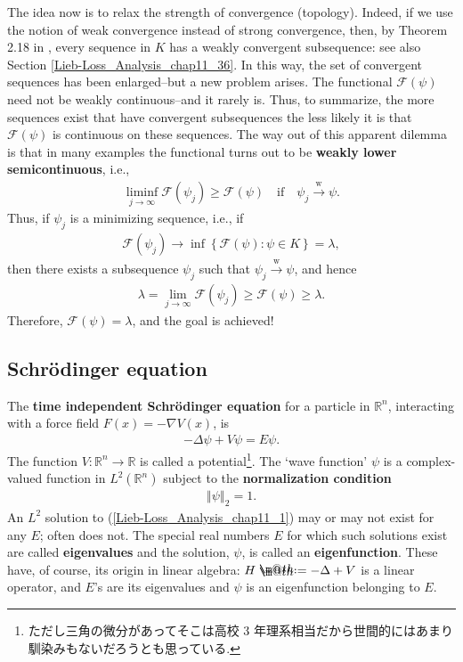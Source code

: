 \documentclass[openany, a4paper, oneside]{book}
\makeatletter
\newcommand*{\defeq}{\mathrel{\rlap{%
\raisebox{0.3ex}{$\m@th\cdot$}}%
\raisebox{-0.3ex}{$\m@th\cdot$}}%
=}
\theoremstyle{break}
\theoremstyle{breakdefn}
\newcommand{\norm}[1]{\left\Vert#1\right\Vert}
\newcommand{\twonorm}[1]{\norm{#1}_2}
\newcommand{\rbk}[1]{\left (#1\right)}
\newcommand{\set}[2]{\left\{#1 : #2\right\}}
\newcommand{\bbR}{\mathbb{R}}
\newcommand{\calF}{\mathcal{F}}
\newcommand{\wto}{\xrightarrow{\text{w}}}
\makeatother
\begin{document}
The idea now is to relax the strength of convergence (topology).
Indeed, if we use the notion of weak convergence instead of strong convergence, then, by Theorem 2.18 in \cite{LiebLoss1},
every sequence in $K$ has a weakly convergent subsequence: see also Section \ref{Lieb-Loss_Analysis_chap11_36}.
In this way, the set of convergent sequences has been enlarged--but a new problem arises.
The functional $\calF (\psi)$ need not be weakly continuous--and it rarely is.
Thus, to summarize, the more sequences exist that have convergent subsequences the less likely it is that
$\calF (\psi)$ is continuous on these sequences.
The way out of this apparent dilemma is that in many examples the functional turns out to be \textbf{weakly lower semicontinuous}, i.e.,
\begin{align}
 \liminf_{j \to \infty} \calF \rbk{\psi_j} \geq \calF \rbk{\psi}
 \quad \text{if} \quad \psi_j \wto \psi.
\end{align}
Thus, if $\psi_j$ is a minimizing sequence, i.e., if
\begin{align}
 \calF \rbk{\psi_j} \to \inf \set{\calF \rbk{\psi}}{\psi \in K} = \lambda,
\end{align}
then there exists a subsequence $\psi_j$ such that $\psi_j \wto \psi$, and hence
\begin{align}
 \lambda
 =
 \lim_{j \to \infty} \calF \rbk{\psi_j} \geq \calF \rbk{\psi} \geq \lambda.
\end{align}
Therefore, $\calF \rbk{\psi} = \lambda$, and the goal is achieved!
\subsection{Schr\"odinger equation}
\label{sec-7-10-1-3}

The \textbf{time independent Schr\"odinger equation} for a particle in $\bbR^n$, interacting with a force field $F (x) = - \nabla V (x)$, is
\begin{align}
 -\Delta \psi + V \psi = E \psi. \label{Lieb-Loss_Analysis_chap11_1}
\end{align}
The function $V \colon \bbR^n \to \bbR$ is called a potential\footnote{ただし三角の微分があってそこは高校 3 年理系相当だから世間的にはあまり馴染みもないだろうとも思っている.
 }.
The `wave function' $\psi$ is a complex-valued function in $L^2 (\bbR^n)$ subject to the \textbf{normalization condition}
\begin{align}
 \twonorm{\psi} = 1.
\end{align}
An $L^2$ solution to (\ref{Lieb-Loss_Analysis_chap11_1}) may or may not exist for any $E$; often does not.
The special real numbers $E$ for which such solutions exist are called \textbf{eigenvalues} and the solution,
$\psi$, is called an \textbf{eigenfunction}.
These have, of course, its origin in linear algebra: $H \defeq - \Delta + V$ is a linear operator,
and $E$'s are its eigenvalues and $\psi$ is an eigenfunction belonging to $E$.
\end{document}

